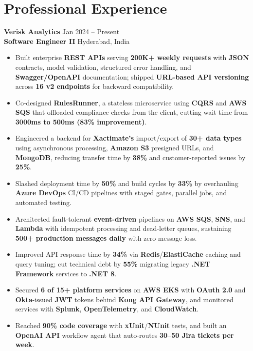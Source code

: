\documentclass[a4paper,10pt]{article}
\begin{document}
\section*{Professional Experience}

\textbf{Verisk Analytics} \hfill Jan 2024 -- Present \\
\textbf{Software Engineer II} \hfill Hyderabad, India

\begin{itemize}[leftmargin=*]
    \item Built enterprise \textbf{REST APIs} serving \textbf{200K+ weekly requests} with \textbf{JSON} contracts, model validation, structured error handling, and \textbf{Swagger/OpenAPI} documentation; shipped \textbf{URL-based API versioning} across \textbf{16 v2 endpoints} for backward compatibility.
    \item Co-designed \textbf{RulesRunner}, a stateless microservice using \textbf{CQRS} and \textbf{AWS SQS} that offloaded compliance checks from the client, cutting wait time from \textbf{3000ms to 500ms (83\% improvement)}.
    \item Engineered a backend for \textbf{Xactimate's} import/export of \textbf{30+ data types} using asynchronous processing, \textbf{Amazon S3} presigned URLs, and \textbf{MongoDB}, reducing transfer time by \textbf{38\%} and customer-reported issues by \textbf{25\%}.
    \item Slashed deployment time by \textbf{50\%} and build cycles by \textbf{33\%} by overhauling \textbf{Azure DevOps} CI/CD pipelines with staged gates, parallel jobs, and automated testing.
    \item Architected fault-tolerant \textbf{event-driven} pipelines on \textbf{AWS SQS}, \textbf{SNS}, and \textbf{Lambda} with idempotent processing and dead-letter queues, sustaining \textbf{500+ production messages daily} with zero message loss.
    \item Improved API response time by \textbf{34\%} via \textbf{Redis}/\textbf{ElastiCache} caching and query tuning; cut technical debt by \textbf{55\%} migrating legacy \textbf{.NET Framework} services to \textbf{.NET 8}.
    \item Secured \textbf{6 of 15+ platform services} on \textbf{AWS EKS} with \textbf{OAuth 2.0} and \textbf{Okta}-issued \textbf{JWT} tokens behind \textbf{Kong API Gateway}, and monitored services with \textbf{Splunk}, \textbf{OpenTelemetry}, and \textbf{CloudWatch}.
    \item Reached \textbf{90\% code coverage} with \textbf{xUnit}/\textbf{NUnit} tests, and built an \textbf{OpenAI API} workflow agent that auto-routes \textbf{30--50 Jira tickets per week}.
\end{itemize}
\end{document}
